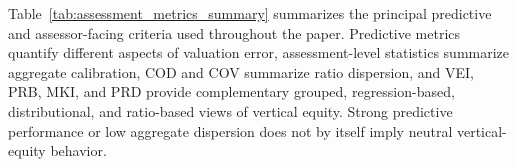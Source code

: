 \documentclass[10pt]{article}
\theoremstyle{definition}
\newcommand{\1}{\mathbf{1}}
\begin{document}


{Table~\ref{tab:assessment_metrics_summary} summarizes the principal predictive and assessor-facing criteria used throughout the paper. Predictive metrics quantify different aspects of valuation error, assessment-level statistics summarize aggregate calibration, COD and COV summarize ratio dispersion, and VEI, PRB, MKI, and PRD provide complementary grouped, regression-based, distributional, and ratio-based views of vertical equity. Strong predictive performance or low aggregate dispersion does not by itself imply neutral vertical-equity behavior.}
\end{document}
